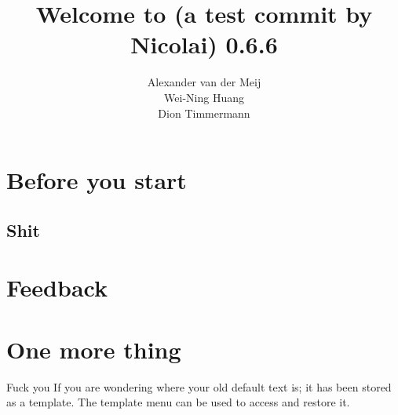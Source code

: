 \documentclass[11pt]{article}
\title{\textbf{Welcome to (a test commit by Nicolai) 0.6.6}}
\author{Alexander van der Meij\\
		Wei-Ning Huang\\
		Dion Timmermann}
\date{}
\begin{document}
\maketitle

\section{Before you start}
	

\subsection{Shit}
	
\section{Feedback}
	

\section{One more thing}
Fuck you
If you are wondering where your old default text is; it has been stored as a template. The template menu can be used to access and restore it. 
\end{document}
